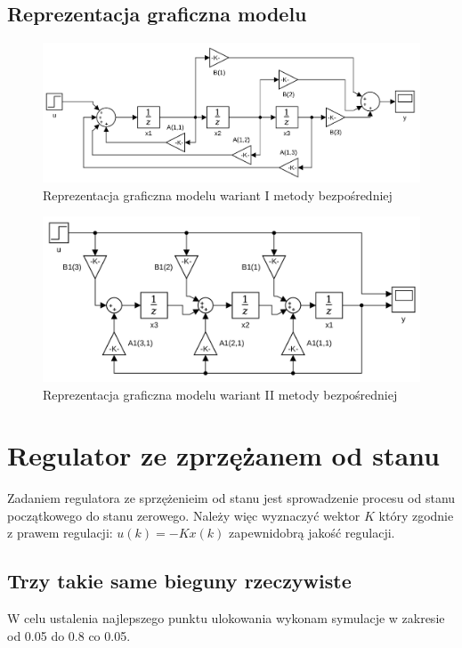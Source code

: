 \documentclass[a4paper, 11pt]{article}
\begin{document}
\subsection{Reprezentacja graficzna modelu}
\begin{figure}[H]
\centering
\includegraphics[scale=0.3]{obiekt2.png}
\caption{Reprezentacja graficzna modelu wariant I metody bezpośredniej}
\end{figure}
\begin{figure}[H]
\centering
\includegraphics[scale=0.35]{obiekt1.png}
\caption{Reprezentacja graficzna modelu wariant II metody bezpośredniej}
\end{figure}

\section{Regulator ze zprzężanem od stanu}
Zadaniem regulatora ze sprzężenieim od stanu jest sprowadzenie procesu od stanu początkowego do stanu zerowego. Należy więc wyznaczyć wektor $K$ który zgodnie z prawem regulacji: $u(k) = -Kx(k)$ zapewnidobrą jakość regulacji. 
\subsection{Trzy takie same bieguny rzeczywiste}
W celu ustalenia najlepszego punktu ulokowania wykonam symulacje w zakresie od 0.05 do 0.8 co 0.05. \\
\end{document}
